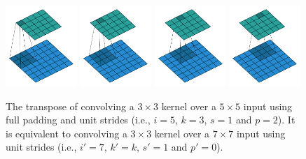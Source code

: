 \begin{figure}[p]
    \centering
    \includegraphics[width=0.24\textwidth]{pdf/full_padding_no_strides_transposed_00.pdf}
    \includegraphics[width=0.24\textwidth]{pdf/full_padding_no_strides_transposed_01.pdf}
    \includegraphics[width=0.24\textwidth]{pdf/full_padding_no_strides_transposed_02.pdf}
    \includegraphics[width=0.24\textwidth]{pdf/full_padding_no_strides_transposed_03.pdf}
    \caption{\label{fig:full_padding_no_strides_transposed} The transpose of
        convolving a $3 \times 3$ kernel over a $5 \times 5$ input using full
        padding and unit strides (i.e., $i = 5$, $k = 3$, $s = 1$ and $p = 2$).
        It is equivalent to convolving a $3 \times 3$ kernel over a $7 \times
        7$ input using unit strides (i.e., $i' = 7$, $k' = k$, $s' = 1$ and
        $p' = 0$).}
\end{figure}

